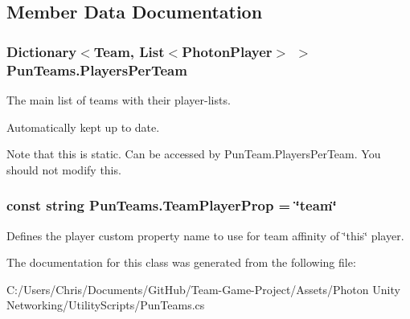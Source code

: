 \subsection{Member Data Documentation}
\subsubsection[{\texorpdfstring{Players\+Per\+Team}{PlayersPerTeam}}]{\setlength{\rightskip}{0pt plus 5cm}Dictionary$<${\bf Team}, List$<${\bf Photon\+Player}$>$ $>$ Pun\+Teams.\+Players\+Per\+Team\hspace{0.3cm}{\ttfamily [static]}}\hypertarget{class_pun_teams_a96cd4b32e4cd5a4447c10f2a3f22a22a}{}\label{class_pun_teams_a96cd4b32e4cd5a4447c10f2a3f22a22a}


The main list of teams with their player-\/lists. 

Automatically kept up to date.

Note that this is static. Can be accessed by Pun\+Team.\+Players\+Per\+Team. You should not modify this.
\subsubsection[{\texorpdfstring{Team\+Player\+Prop}{TeamPlayerProp}}]{\setlength{\rightskip}{0pt plus 5cm}const string Pun\+Teams.\+Team\+Player\+Prop = \char`\"{}team\char`\"{}}\hypertarget{class_pun_teams_a036c6f1b595a3a4d3df5dc6566950667}{}\label{class_pun_teams_a036c6f1b595a3a4d3df5dc6566950667}


Defines the player custom property name to use for team affinity of \char`\"{}this\char`\"{} player.



The documentation for this class was generated from the following file\+:\begin{DoxyCompactItemize}
\item 
C\+:/\+Users/\+Chris/\+Documents/\+Git\+Hub/\+Team-\/\+Game-\/\+Project/\+Assets/\+Photon Unity Networking/\+Utility\+Scripts/Pun\+Teams.\+cs\end{DoxyCompactItemize}
